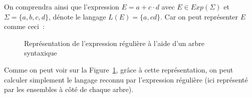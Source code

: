 \begin{example}
    On comprendra ainsi que l'expression \(E = a+c \cdot d\) avec \(E \in
    Exp(\Sigma)\) et \(\Sigma = \{a, b, c, d\}\), dénote le langage \(L(E) =
    \{a, cd\}\). Car on peut représenter \(E\) comme ceci~:

    \begin{figure}[H]
        \centering
        \captionsetup{type=figure,justification=centering}
        \caption{
            Représentation de l'expression régulière à l'aide d'un arbre syntaxique
        }\label{fig:arbre_syn}
    \end{figure}

    Comme on peut voir sur la Figure~\ref{fig:arbre_syn}, grâce à cette
    représentation, on peut calculer simplement le langage reconnu par
    l'expression régulière (ici représenté par les ensembles à c\^{o}té de
    chaque arbre).
\end{example}




